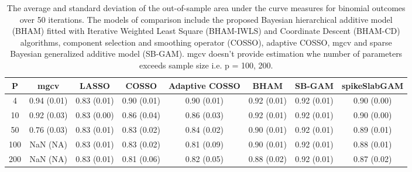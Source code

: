 \begin{table}[ht]
\centering
\begin{tabular}{cccccccc}
  \hline
P & mgcv & LASSO & COSSO & Adaptive COSSO & BHAM & SB-GAM & spikeSlabGAM \\ 
  \hline
  4 & 0.94 (0.01) & 0.83 (0.01) & 0.90 (0.01) & 0.90 (0.01) & 0.92 (0.01) & 0.92 (0.01) & 0.90 (0.00) \\ 
   10 & 0.92 (0.03) & 0.83 (0.00) & 0.86 (0.04) & 0.86 (0.03) & 0.92 (0.01) & 0.92 (0.01) & 0.90 (0.00) \\ 
   50 & 0.76 (0.03) & 0.83 (0.01) & 0.83 (0.02) & 0.84 (0.02) & 0.90 (0.01) & 0.92 (0.01) & 0.89 (0.01) \\ 
  100 & NaN (NA) & 0.83 (0.01) & 0.83 (0.02) & 0.81 (0.09) & 0.90 (0.01) & 0.92 (0.01) & 0.88 (0.01) \\ 
  200 & NaN (NA) & 0.83 (0.01) & 0.81 (0.06) & 0.82 (0.05) & 0.88 (0.02) & 0.92 (0.01) & 0.87 (0.02) \\ 
   \hline
\end{tabular}
\caption{The average and standard deviation of the out-of-sample area under the curve measures
    for binomial outcomes over 50 iterations. The models of comparison include the proposed Bayesian
    hierarchical additive model (BHAM) fitted with Iterative Weighted Least Square (BHAM-IWLS) and
    Coordinate Descent (BHAM-CD) algorithms, component selection and smoothing operator (COSSO),
    adaptive COSSO, mgcv and sparse Bayesian generalized additive model (SB-GAM). mgcv doesn't provide
    estimation whe number of parameters exceeds sample size i.e. p = 100, 200.} 
\label{tab:bin_auc}
\end{table}
